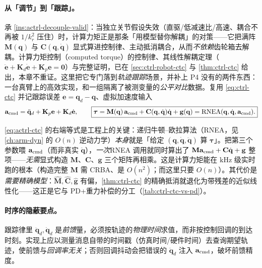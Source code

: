 \paragraph{从「调节」到「跟踪」。}
承 \cref{ins:actrl-decouple-valid}：当独立关节假设失效（直驱/低减速比/高速、耦合不再被 $1/k_r^2$ 压住）时，计算力矩正是那条「用模型替你解耦」的对策——它把满阵 $\mathbf{M}(\mathbf{q})$ 与 $\mathbf{C}(\mathbf{q},\dot{\mathbf{q}})$ 显式算进控制律、主动抵消耦合，从而\emph{不依赖}齿轮箱去解耦。计算力矩控制（computed torque）的控制律、其线性解耦定理（$\ddot{\mathbf{e}}+\mathbf{K}_d\dot{\mathbf{e}}+\mathbf{K}_p\mathbf{e}=\mathbf{0}$）与完整证明，已在 \cref{sec:ctrl-robot-ctc} 与 \cref{thm:ctrl-ctc} 给出，本章不重证。这里把它专门落到\emph{轨迹跟踪}场景，并补上 P4 没有的两件东西：一台真臂上的高效实现，和一组隔离了被测变量的\emph{公平对比}数据。复用 \cref{eq:ctrl-ctc} 并记跟踪误差 $\mathbf{e}=\mathbf{q}_d-\mathbf{q}$、虚拟加速度输入
\begin{equation}
  \mathbf{a}_{\rm cmd}=\ddot{\mathbf{q}}_d+\mathbf{K}_p\mathbf{e}+\mathbf{K}_d\dot{\mathbf{e}},\qquad
  \boxed{\boldsymbol{\tau}=\mathbf{M}(\mathbf{q})\,\mathbf{a}_{\rm cmd}+\mathbf{C}(\mathbf{q},\dot{\mathbf{q}})\dot{\mathbf{q}}+\mathbf{g}(\mathbf{q})=\mathrm{RNEA}(\mathbf{q},\dot{\mathbf{q}},\mathbf{a}_{\rm cmd}).}
  \label{eq:actrl-ctc}
\end{equation}

\begin{insight}[一次逆动力学算尽前馈]
\cref{eq:actrl-ctc} 的右端等式是工程上的关键：递归牛顿--欧拉算法（RNEA，见 \cref{ch:arm-dyn} 的 $O(n)$ 逆动力学）\emph{本身}就是「给定 $(\mathbf{q},\dot{\mathbf{q}},\ddot{\mathbf{q}})$ 算 $\boldsymbol{\tau}$」。把第三个参数喂 $\mathbf{a}_{\rm cmd}$（而非真实 $\ddot{\mathbf{q}}$），\emph{一次}RNEA 调用就同时算出了 $\mathbf{M}\mathbf{a}_{\rm cmd}+\mathbf{C}\dot{\mathbf{q}}+\mathbf{g}$ 整项——\emph{无需}显式构造 $\mathbf{M}$、$\mathbf{C}$、$\mathbf{g}$ 三个矩阵再相乘。这是计算力矩能在 $\mathrm{kHz}$ 级实时跑的根本（构造完整 $\mathbf{M}$ 需 CRBA、是 $O(n^2)$；而这里只要 $O(n)$）。其代价是\emph{需要精确模型}：$\hat{\mathbf{M}},\hat{\mathbf{C}},\hat{\mathbf{g}}$ 有偏，\cref{thm:ctrl-ctc} 的精确抵消就退化为带残差的近似线性化——这正是它与 PD+重力补偿的分工（\cref{tab:ctrl-ctc-vs-pd}）。
\end{insight}

\paragraph{时序的隐蔽要点。}
跟踪律里 $\ddot{\mathbf{q}}_d,\dot{\mathbf{q}}_d$ 是\emph{前馈}量，必须按轨迹的\emph{物理时间}求值，而非按控制回调的到达时刻。实现上应以测量消息自带的时间戳（仿真时间/硬件时间）去查询期望轨迹，使前馈与\emph{回调率无关}；否则回调抖动会把错误的 $\ddot{\mathbf{q}}_d$ 注入 $\mathbf{a}_{\rm cmd}$，破坏前馈精度。

